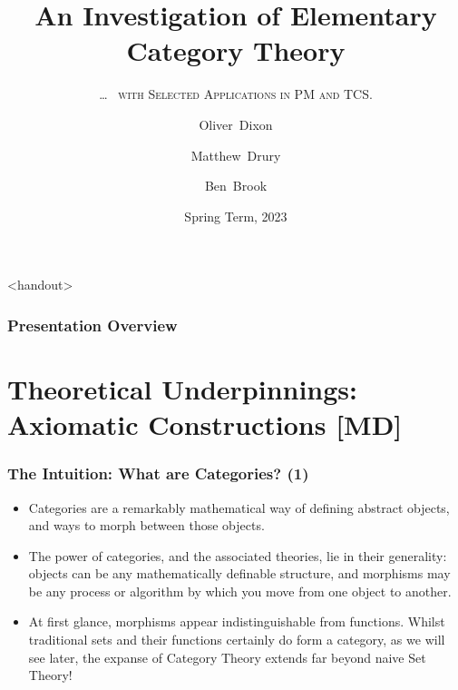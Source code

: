 \documentclass{beamer}
\title[Elementary Category Theory]%
        {An Investigation of Elementary Category Theory}
\subtitle{\ldots\ \fontfamily{lmr}%
        \textsc{with Selected Applications in PM and TCS.}}
\author[Dixon, Drury \& Brook]%
        {Oliver~Dixon \and Matthew~Drury \and Ben~Brook}
\institute[]{Department of Mathematics, University of York}
\date{Spring Term, 2023}
\numberwithin{figure}{section}
\begin{document}
\frame{\titlepage}

\begin{frame}<handout>
        \frametitle{Presentation Overview}
        \tableofcontents
\end{frame}

\section{Theoretical Underpinnings: Axiomatic Constructions [MD]}

\begin{frame}
        \frametitle{The Intuition: What are Categories? (1)}
        \begin{itemize}
                \item Categories are a remarkably mathematical way of defining
                        abstract objects, and ways to morph between those
                        objects.
                \item The power of categories, and the associated theories, lie
                        in their generality: objects can be any mathematically
                        definable structure, and morphisms may be any process or
                        algorithm by which you move from one object to another.
                \item At first glance, morphisms appear indistinguishable from
                        functions. Whilst traditional sets and their functions
                        certainly do form a category, as we will see later, the
                        expanse of Category Theory extends far beyond naive Set
                        Theory!
        \end{itemize}
\end{frame}
\end{document}
